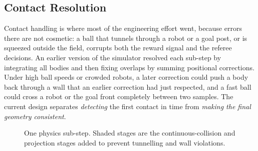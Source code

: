 

\subsection{Contact Resolution}
\label{sec:sim_contact}

Contact handling is where most of the engineering effort went, because errors there
are not cosmetic: a ball that tunnels through a robot or a goal post, or is squeezed
outside the field, corrupts both the reward signal and the referee decisions.  An
earlier version of the simulator resolved each sub-step by integrating all bodies and
then fixing overlaps by summing positional corrections.  Under high ball speeds or
crowded robots, a later correction could push a body back through a wall that an
earlier correction had just respected, and a fast ball could cross a robot or the
goal front completely between two samples.  The current design separates
\emph{detecting} the first contact in time from \emph{making the final geometry
consistent}.

\begin{figure}[ht]
    \centering
    \caption{One physics sub-step.  Shaded stages are the continuous-collision
    and projection stages added to prevent tunnelling and wall violations.}
    \label{fig:sim_substep}
\end{figure}

